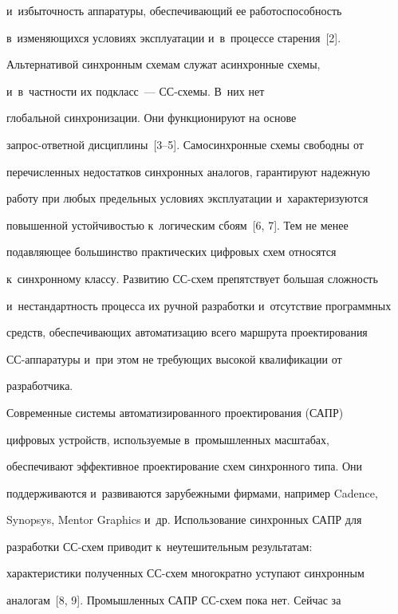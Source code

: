 и~из\-бы\-точ\-ность аппаратуры, обес\-пе\-чи\-ва\-ющий ее ра\-бо\-то\-спо\-соб\-ность 

в~из\-ме\-ня\-ющих\-ся условиях эксплуатации и~в~процессе старения~[2].

  

  Альтернативой синхронным схемам служат асинхронные схемы, 

и~в~част\-ности их подкласс~--- СС-схе\-мы. В~них нет 

глобальной синхронизации. Они функционируют на основе  

за\-прос-от\-вет\-ной дис\-цип\-ли\-ны~[3--5]. Самосинхронные схе\-мы свободны от 

пе\-ре\-чис\-лен\-ных недостатков синхронных аналогов, гарантируют на\-де\-жную 

работу при любых предельных условиях эксплуатации и~характеризуются 

повышенной устой\-чи\-востью к~логическим сбоям~[6, 7]. Тем не менее 

по\-дав\-ля\-ющее большинство практических циф\-ро\-вых схем относятся 

к~синхронному классу. Развитию СС-схем препятствует большая слож\-ность 

и~не\-стан\-дарт\-ность процесса их руч\-ной раз\-ра\-бот\-ки и~отсутствие программных 

средств, обес\-пе\-чи\-ва\-ющих автоматизацию всего марш\-ру\-та проектирования 

\mbox{СС-ап}\-па\-ра\-ту\-ры и~при этом не тре\-бу\-ющих высокой квалификации от 

раз\-ра\-бот\-чика.

  

  Современные системы автоматизированного проектирования (САПР) 

циф\-ро\-вых устройств, ис\-поль\-зу\-емые в~промышленных мас\-шта\-бах, 

обеспечивают эффективное проектирование схем синхронного типа. Они 

поддерживаются и~развиваются за\-ру\-беж\-ны\-ми фирмами, например Cadence, 

Synopsys, Mentor Graphics и~др. Использование синхронных САПР для 

разработки СС-схем приводит к~неутешительным результатам: 

характеристики полученных СС-схем многократно уступают синхронным 

аналогам~[8, 9]. Промышленных САПР СС-схем пока нет. Сейчас за 


